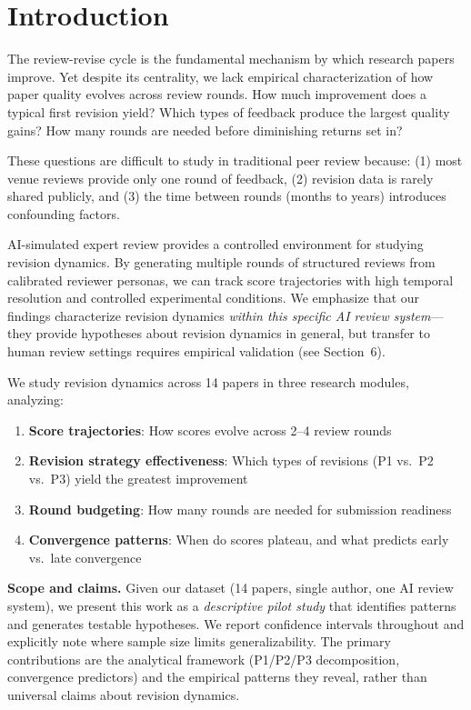 \section{Introduction}

The review-revise cycle is the fundamental mechanism by which research papers improve. Yet despite its centrality, we lack empirical characterization of how paper quality evolves across review rounds. How much improvement does a typical first revision yield? Which types of feedback produce the largest quality gains? How many rounds are needed before diminishing returns set in?

These questions are difficult to study in traditional peer review because: (1) most venue reviews provide only one round of feedback, (2) revision data is rarely shared publicly, and (3) the time between rounds (months to years) introduces confounding factors.

AI-simulated expert review provides a controlled environment for studying revision dynamics. By generating multiple rounds of structured reviews from calibrated reviewer personas, we can track score trajectories with high temporal resolution and controlled experimental conditions. We emphasize that our findings characterize revision dynamics \emph{within this specific AI review system}---they provide hypotheses about revision dynamics in general, but transfer to human review settings requires empirical validation (see Section~6).

\noindent We study revision dynamics across 14 papers in three research modules, analyzing:
\begin{enumerate}
    \item \textbf{Score trajectories}: How scores evolve across 2--4 review rounds
    \item \textbf{Revision strategy effectiveness}: Which types of revisions (P1 vs.\ P2 vs.\ P3) yield the greatest improvement
    \item \textbf{Round budgeting}: How many rounds are needed for submission readiness
    \item \textbf{Convergence patterns}: When do scores plateau, and what predicts early vs.\ late convergence
\end{enumerate}

\noindent \textbf{Scope and claims.} Given our dataset (14 papers, single author, one AI review system), we present this work as a \emph{descriptive pilot study} that identifies patterns and generates testable hypotheses. We report confidence intervals throughout and explicitly note where sample size limits generalizability. The primary contributions are the analytical framework (P1/P2/P3 decomposition, convergence predictors) and the empirical patterns they reveal, rather than universal claims about revision dynamics.
